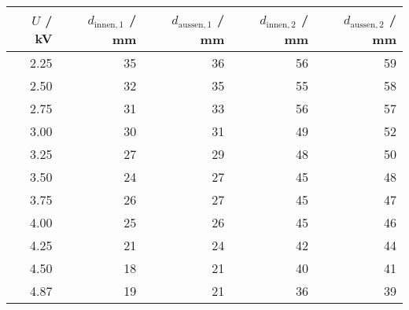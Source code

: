 \begin{tabular}{r|rr|rr}
$U$ / kV & $d_{\text{innen},1}$ / mm & $d_{\text{aussen},1}$ / mm & $d_{\text{innen},2}$ / mm & $d_{\text{aussen},2}$ / mm \\
\hline
2.25 & 35 & 36 & 56 & 59\\
2.50 & 32 & 35 & 55 & 58\\
2.75 & 31 & 33 & 56 & 57\\
3.00 & 30 & 31 & 49 & 52\\
3.25 & 27 & 29 & 48 & 50\\
3.50 & 24 & 27 & 45 & 48\\
3.75 & 26 & 27 & 45 & 47\\
4.00 & 25 & 26 & 45 & 46\\
4.25 & 21 & 24 & 42 & 44\\
4.50 & 18 & 21 & 40 & 41\\
4.87 & 19 & 21 & 36 & 39\\
\end{tabular}
